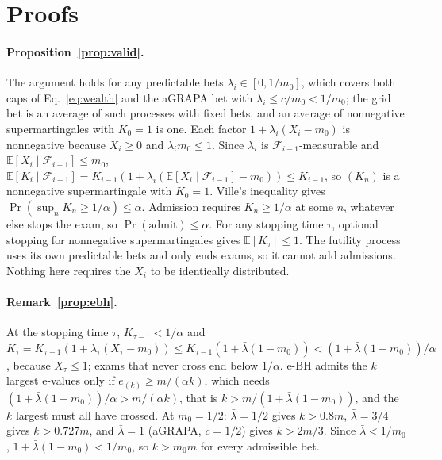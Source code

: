 \section{Proofs}
\label{app:proofs}

\paragraph{Proposition~\ref{prop:valid}.} The argument holds for any predictable bets $\lambda_i\in[0,1/m_0]$, which covers both caps of Eq.~\eqref{eq:wealth} and the aGRAPA bet with $\lambda_i\le c/m_0<1/m_0$; the grid bet is an average of such processes with fixed bets, and an average of nonnegative supermartingales with $K_0=1$ is one. Each factor $1+\lambda_i(X_i-m_0)$ is nonnegative because $X_i\ge0$ and $\lambda_i m_0\le1$. Since $\lambda_i$ is $\mathcal F_{i-1}$-measurable and $\mathbb{E}[X_i\mid\mathcal F_{i-1}]\le m_0$, $\mathbb{E}[K_i\mid\mathcal F_{i-1}]=K_{i-1}(1+\lambda_i(\mathbb{E}[X_i\mid\mathcal F_{i-1}]-m_0))\le K_{i-1}$, so $(K_n)$ is a nonnegative supermartingale with $K_0=1$. Ville's inequality gives $\Pr(\sup_nK_n\ge1/\alpha)\le\alpha$. Admission requires $K_n\ge1/\alpha$ at some $n$, whatever else stops the exam, so $\Pr(\text{admit})\le\alpha$. For any stopping time $\tau$, optional stopping for nonnegative supermartingales gives $\mathbb{E}[K_\tau]\le1$. The futility process uses its own predictable bets and only ends exams, so it cannot add admissions. Nothing here requires the $X_i$ to be identically distributed.

\paragraph{Remark~\ref{prop:ebh}.} At the stopping time $\tau$, $K_{\tau-1}<1/\alpha$ and $K_\tau=K_{\tau-1}(1+\lambda_\tau(X_\tau-m_0))\le K_{\tau-1}(1+\bar\lambda(1-m_0))<(1+\bar\lambda(1-m_0))/\alpha$, because $X_\tau\le1$; exams that never cross end below $1/\alpha$. e-BH admits the $k$ largest e-values only if $e_{(k)}\ge m/(\alpha k)$, which needs $(1+\bar\lambda(1-m_0))/\alpha>m/(\alpha k)$, that is $k>m/(1+\bar\lambda(1-m_0))$, and the $k$ largest must all have crossed. At $m_0=1/2$: $\bar\lambda=1/2$ gives $k>0.8m$, $\bar\lambda=3/4$ gives $k>0.727m$, and $\bar\lambda=1$ (aGRAPA, $c=1/2$) gives $k>2m/3$. Since $\bar\lambda<1/m_0$, $1+\bar\lambda(1-m_0)<1/m_0$, so $k>m_0m$ for every admissible bet.

